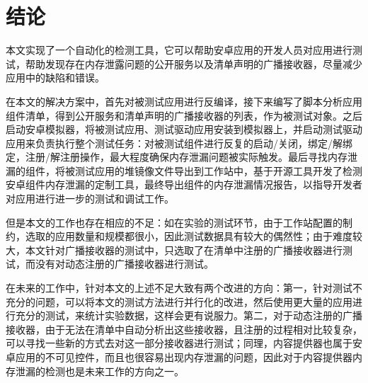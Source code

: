 \chapter{结论}\label{chapter_conclusion}
本文实现了一个自动化的检测工具，它可以帮助安卓应用的开发人员对应用进行测试，帮助发现存在内存泄露问题的公开服务以及清单声明的广播接收器，尽量减少应用中的缺陷和错误。

在本文的解决方案中，首先对被测试应用进行反编译，接下来编写了脚本分析应用组件清单，得到公开服务和清单声明的广播接收器的列表，作为被测试对象。之后启动安卓模拟器，将被测试应用、测试驱动应用安装到模拟器上，并启动测试驱动应用来负责执行整个测试任务：对被测试组件进行反复的启动/关闭，绑定/解绑定，注册/解注册操作，最大程度确保内存泄漏问题被实际触发。最后寻找内存泄漏的组件，将被测试应用的堆镜像文件导出到工作站中，基于开源工具开发了检测安卓组件内存泄漏的定制工具，最终导出组件的内存泄漏情况报告，以指导开发者对应用进行进一步的测试和调试工作。

但是本文的工作也存在相应的不足：如在实验的测试环节，由于工作站配置的制约，选取的应用数量和规模都很小，因此测试数据具有较大的偶然性；由于难度较大，本文针对广播接收器的测试中，只选取了在清单中注册的广播接收器进行测试，而没有对动态注册的广播接收器进行测试。

在未来的工作中，针对本文的上述不足大致有两个改进的方向：第一，针对测试不充分的问题，可以将本文的测试方法进行并行化的改进，然后使用更大量的应用进行充分的测试，来统计实验数据，这样会更有说服力。第二，对于动态注册的广播接收器，由于无法在清单中自动分析出这些接收器，且注册的过程相对比较复杂，可以寻找一些新的方式去对这一部分接收器进行测试；同理，内容提供器也属于安卓应用的不可见控件，而且也很容易出现内存泄漏的问题，因此对于内容提供器内存泄漏的检测也是未来工作的方向之一。